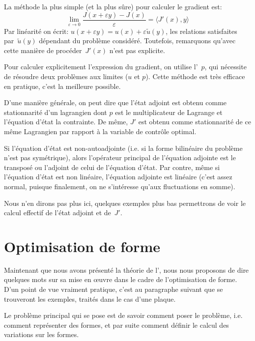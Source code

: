 \medskip
La méthode la plus simple (et la plus sûre) pour calculer le gradient est:
\begin{equation}
\lim_{\varepsilon\rightarrow0} \dfrac{J(x+\varepsilon y)-J(x)}{\varepsilon}
=\langle J'(x),y\rangle %
\end{equation}
Par linéarité on écrit: $u(x+\varepsilon y)=u(x)+\varepsilon \tilde{u}(y)$, les relations satisfaites par~$\tilde{u}(y)$ dépendant du problème considéré.
Toutefois, remarquons qu'avec cette manière de procéder~$J'(x)$ n'est pas explicite.

\medskip
Pour calculer explicitement l'expression du gradient, on utilise l'~$p$, qui nécessite de résoudre deux problèmes aux limites ($u$ et $p$).
Cette méthode est très efficace en pratique, c'est la meilleure possible.

D'une manière générale, on peut dire que l'état adjoint est obtenu comme stationnarité d'un lagrangien dont $p$ est le multiplicateur de Lagrange et l'équation d'état la contrainte.
De même, $J'$ est obtenu comme stationnarité de ce même Lagrangien par rapport à la variable de contrôle optimal.

Si l'équation d'état est non-autoadjointe (i.e. si la forme bilinéaire du problème n'est pas symétrique), alors l'opérateur principal de l'équation adjointe est le transposé ou l'adjoint de celui de l'équation d'état.
Par contre, même si l'équation d'état est non linéaire, l'équation adjointe est linéaire (c'est assez normal, puisque finalement, on ne s'intéresse qu'aux fluctuations en somme).

Nous n'en dirons pas plus ici, quelques exemples plus bas permettrons de voir le calcul effectif de l'état adjoint et de~$J'$.


\medskip
\section{Optimisation de forme}

Maintenant que nous avons présenté la théorie de l', nous nous proposons de dire quelques mots sur sa mise en œuvre dans le cadre de l'optimisation de forme. D'un point de vue vraiment pratique, c'est au paragraphe suivant que se trouveront les exemples, traités dans le cas d'une plaque.

\medskip
Le problème principal qui se pose est de savoir comment poser le problème, i.e. comment représenter des formes, et par suite comment définir le calcul des variations sur les formes.

